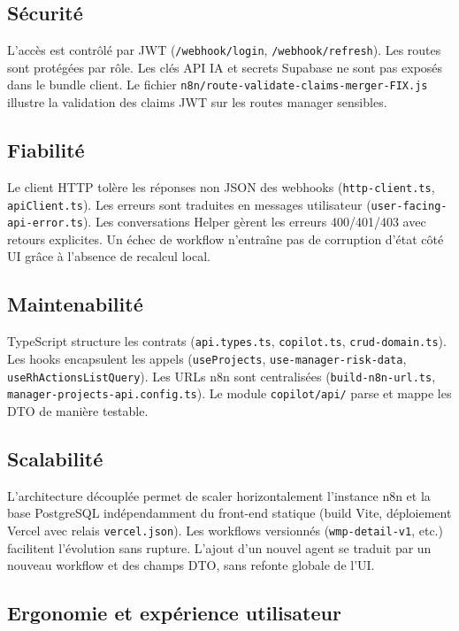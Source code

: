 \subsection{Sécurité}

L'accès est contrôlé par JWT (\texttt{/webhook/login}, \texttt{/webhook/refresh}). Les routes sont protégées par rôle. Les clés API IA et secrets Supabase ne sont pas exposés dans le bundle client. Le fichier \texttt{n8n/route-validate-claims-merger-FIX.js} illustre la validation des claims JWT sur les routes manager sensibles.

\subsection{Fiabilité}

Le client HTTP tolère les réponses non JSON des webhooks (\texttt{http-client.ts}, \texttt{apiClient.ts}). Les erreurs sont traduites en messages utilisateur (\texttt{user-facing-api-error.ts}). Les conversations Helper gèrent les erreurs 400/401/403 avec retours explicites. Un échec de workflow n'entraîne pas de corruption d'état côté UI grâce à l'absence de recalcul local.

\subsection{Maintenabilité}

TypeScript structure les contrats (\texttt{api.types.ts}, \texttt{copilot.ts}, \texttt{crud-domain.ts}). Les hooks encapsulent les appels (\texttt{useProjects}, \texttt{use-manager-risk-data}, \texttt{useRhActionsListQuery}). Les URLs n8n sont centralisées (\texttt{build-n8n-url.ts}, \texttt{manager-projects-api.config.ts}). Le module \texttt{copilot/api/} parse et mappe les DTO de manière testable.

\subsection{Scalabilité}

L'architecture découplée permet de scaler horizontalement l'instance n8n et la base PostgreSQL indépendamment du front-end statique (build Vite, déploiement Vercel avec relais \texttt{vercel.json}). Les workflows versionnés (\texttt{wmp-detail-v1}, etc.) facilitent l'évolution sans rupture. L'ajout d'un nouvel agent se traduit par un nouveau workflow et des champs DTO, sans refonte globale de l'UI.

\subsection{Ergonomie et expérience utilisateur}

